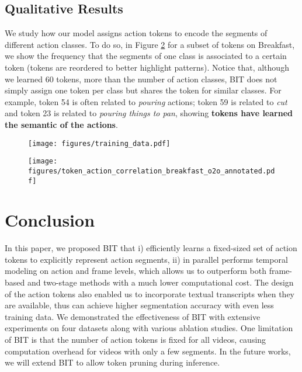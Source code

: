 \documentclass[10pt,twocolumn,letterpaper]{article}
\newcommand{\0}{\boldsymbol{0}}
\begin{document}
\subsection{Qualitative Results}
\label{sec:vis}
We study how our model assigns action tokens to encode the segments of different action classes. To do so, in Figure \ref{fig:correlation} for a subset of tokens on Breakfast, we show the frequency that the segments of one class is associated to a certain token (tokens are reordered to better highlight patterns).
Notice that, although we learned 60 tokens, more than the number of action classes, BIT does not simply assign one token per class but shares the token for similar classes. For example, token 54 is often related to \textit{pouring} actions; token 59 is related to \textit{cut} and token 23 is related to \textit{pouring things to pan}, showing \textbf{tokens have learned the semantic of the actions}.

\begin{figure}
   \centering
   \texttt{[image: figures/training\_data.pdf]}
   \label{table:data}
\end{figure}

\begin{figure}
   \centering
   \texttt{[image: figures/token\_action\_correlation\_breakfast\_o2o\_annotated.pdf]}
   \label{fig:correlation}
\end{figure}

\section{Conclusion}
\vspace{-3mm}
In this paper, we proposed BIT that i) efficiently learns a fixed-sized set of action tokens to explicitly represent action segments, ii) in parallel performs temporal modeling on action and frame levels, which allows us to outperform both frame-based and two-stage methods with a much lower computational cost. 
The design of the action tokens also enabled us to incorporate textual transcripts when they are available, thus can achieve higher segmentation accuracy with even less training data. 
We demonstrated the effectiveness of BIT with extensive experiments on four datasets along with various ablation studies. 
One limitation of BIT is that the number of action tokens is fixed for all videos, causing computation overhead for videos with only a few segments. In the future works, we will extend BIT to allow token pruning during inference.






{
\small


}
\end{document}
